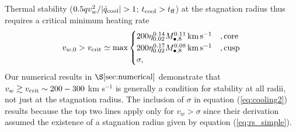 \documentclass[usenatbib,fleqn]{mn2e}
\newcommand\lsim{\mathrel{\rlap{\lower4pt\hbox{\hskip1pt$\sim$}}
    \raise1pt\hbox{$<$}}}
\newcommand\gsim{\mathrel{\rlap{\lower4pt\hbox{\hskip1pt$\sim$}}
    \raise1pt\hbox{$>$}}}
\newcommand{\vw}{v_w}
\begin{document}
Thermal stability ($0.5 q \vw^2/|\dot{q}_{\rm cool}| > 1$; $t_{\rm cool} > t_{\rm ff}$) at the stagnation radius thus requires a critical minimum heating rate
\begin{align}
v_{w,0} > v_{\rm crit} \simeq
  {\rm max}\begin{cases}
   200 \eta_{0.02}^{0.14} M_{\bullet,8}^{0.11}\,{\rm km\,s^{-1}}  &, \text{core}\\
   200 \eta_{0.02}^{0.17} M_{\bullet,8}^{0.08}\,{\rm km\,s^{-1}}   &, \text{cusp}\\
\sigma,     
  \end{cases}
  \label{eq:cooling2}
\end{align}
Our numerical results in $\S\ref{sec:numerical}$ demonstrate that $v_{w} \gtrsim v_{\rm crit} \sim 200-300$ km s$^{-1}$ is generally a condition for stability at all radii, not just at the stagnation radius.  The inclusion of $\sigma$ in equation (\ref{eq:cooling2}) results because the top two lines apply only for $v_{w} > \sigma$ since their derivation assumed the existence of a stagnation radius given by equation (\ref{eq:rs_simple}).




\end{document}
